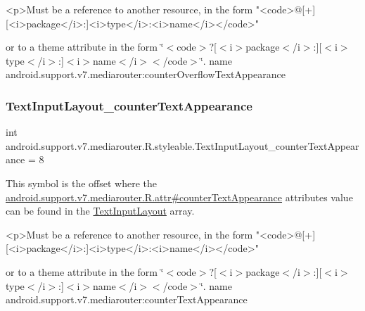 \begin{DoxyVerb}      <p>Must be a reference to another resource, in the form "<code>@[+][<i>package</i>:]<i>type</i>:<i>name</i></code>"
\end{DoxyVerb}
 or to a theme attribute in the form \char`\"{}$<$code$>$?\mbox{[}$<$i$>$package$<$/i$>$\+:\mbox{]}\mbox{[}$<$i$>$type$<$/i$>$\+:\mbox{]}$<$i$>$name$<$/i$>$$<$/code$>$\char`\"{}.  name android.\+support.\+v7.\+mediarouter\+:counter\+Overflow\+Text\+Appearance \mbox{\label{classandroid_1_1support_1_1v7_1_1mediarouter_1_1R_1_1styleable_ae9e5833b8f6e6eecad4561363b0a89cb}} 
\subsubsection{\texorpdfstring{Text\+Input\+Layout\+\_\+counter\+Text\+Appearance}{TextInputLayout\_counterTextAppearance}}
{\footnotesize\ttfamily int android.\+support.\+v7.\+mediarouter.\+R.\+styleable.\+Text\+Input\+Layout\+\_\+counter\+Text\+Appearance = 8\hspace{0.3cm}{\ttfamily [static]}}

This symbol is the offset where the \hyperlink{classandroid_1_1support_1_1v7_1_1mediarouter_1_1R_1_1attr_ae2781dd8f0eed4b5270ab26c4e25229c}{android.\+support.\+v7.\+mediarouter.\+R.\+attr\#counter\+Text\+Appearance} attribute\textquotesingle{}s value can be found in the \hyperlink{classandroid_1_1support_1_1v7_1_1mediarouter_1_1R_1_1styleable_a935a5feb3f0394eb1c07f26b207dfb2d}{Text\+Input\+Layout} array.

\begin{DoxyVerb}      <p>Must be a reference to another resource, in the form "<code>@[+][<i>package</i>:]<i>type</i>:<i>name</i></code>"
\end{DoxyVerb}
 or to a theme attribute in the form \char`\"{}$<$code$>$?\mbox{[}$<$i$>$package$<$/i$>$\+:\mbox{]}\mbox{[}$<$i$>$type$<$/i$>$\+:\mbox{]}$<$i$>$name$<$/i$>$$<$/code$>$\char`\"{}.  name android.\+support.\+v7.\+mediarouter\+:counter\+Text\+Appearance \mbox{\label{classandroid_1_1support_1_1v7_1_1mediarouter_1_1R_1_1styleable_a3bb087258c99f0fc35c00751b6ce5741}} 
